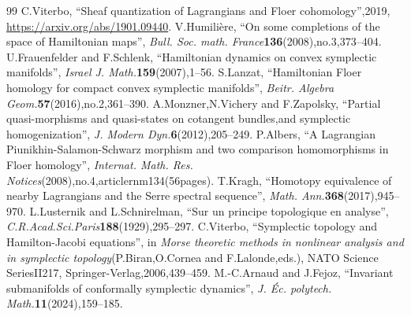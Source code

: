 \documentclass[10pt,a4paper]{amsart}
\theoremstyle{definition}
\begin{document}
\begin{thebibliography}{99}
 C.Viterbo, ``Sheaf quantization of Lagrangians and Floer cohomology'',2019, \url{https://arxiv.org/abs/1901.09440}.
 V.Humilière, ``On some completions of the space of Hamiltonian maps'', \emph{Bull. Soc. math. France}\textbf{136}(2008),no.3,373--404.
 U.Frauenfelder and F.Schlenk, ``Hamiltonian dynamics on convex symplectic manifolds'', \emph{Israel J. Math.}\textbf{159}(2007),1--56.
 S.Lanzat, ``Hamiltonian Floer homology for compact convex symplectic manifolds'', \emph{Beitr. Algebra Geom.}\textbf{57}(2016),no.2,361--390.
 A.Monzner,N.Vichery and F.Zapolsky, ``Partial quasi-morphisms and quasi-states on cotangent bundles,and symplectic homogenization'', \emph{J. Modern Dyn.}\textbf{6}(2012),205--249.
 P.Albers, ``A Lagrangian Piunikhin-Salamon-Schwarz morphism and two comparison homomorphisms in Floer homology'', \emph{Internat. Math. Res. Notices}(2008),no.4,articlernm134(56pages).
 T.Kragh, ``Homotopy equivalence of nearby Lagrangians and the Serre spectral sequence'', \emph{Math. Ann.}\textbf{368}(2017),945--970.
 L.Lusternik and L.Schnirelman, ``Sur un principe topologique en analyse'', \emph{C.R.Acad.Sci.Paris}\textbf{188}(1929),295--297.
 C.Viterbo, ``Symplectic topology and Hamilton-Jacobi equations'', in \emph{Morse theoretic methods in nonlinear analysis and in symplectic topology}(P.Biran,O.Cornea and F.Lalonde,eds.), NATO Science SeriesII217, Springer-Verlag,2006,439--459.
 M.-C.Arnaud and J.Fejoz, ``Invariant submanifolds of conformally symplectic dynamics'', \emph{J. \'Ec. polytech. Math.}\textbf{11}(2024),159--185.
\end{thebibliography}
\end{document}
